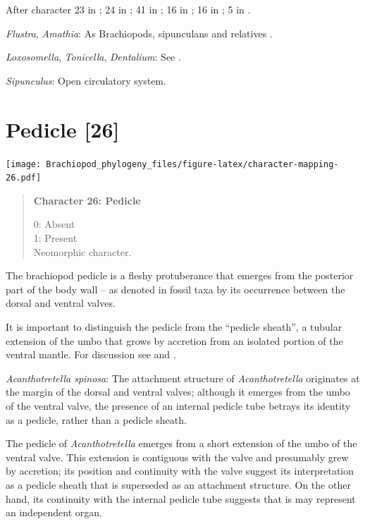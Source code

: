 \documentclass[openany]{book}
\begin{document}
After character 23 in \citet{Haszprunar1996}; 24 in
\citet{Haszprunar2000}; 41 in \citet{Rouse1999}; 16 in
\citet{Scheltema1993}; 16 in \citet{Vinther2008}; 5 in
\citet{Haszprunar2008}.

\hypertarget{Amathia-coding-25}{}
\emph{Flustra}, \emph{Amathia}: As Brachiopods, sipunculans and
relatives \citep{Ruppert1983}.

\hypertarget{Dentalium-coding-25}{}
\emph{Loxosomella}, \emph{Tonicella}, \emph{Dentalium}: See
\citet{Haszprunar2008}.

\hypertarget{Sipunculus-coding-25}{}
\emph{Sipunculus}: Open circulatory system.

\section{Pedicle {[}26{]}}\label{pedicle-26}

\texttt{[image: Brachiopod\_phylogeny\_files/figure-latex/character-mapping-26.pdf]}

\begin{quote}
\textbf{Character 26: Pedicle}

0: Absent\\
1: Present\\
Neomorphic character.
\end{quote}

The brachiopod pedicle is a fleshy protuberance that emerges from the
posterior part of the body wall -- as denoted in fossil taxa by its
occurrence between the dorsal and ventral valves.

It is important to distinguish the pedicle from the ``pedicle sheath'',
a tubular extension of the umbo that grows by accretion from an isolated
portion of the ventral mantle. For discussion see
\citet{Holmer2018Theattachment} and \citet{Bassett2017Earliestontogeny}.

\hypertarget{Acanthotretella_spinosa-coding-26}{}
\emph{Acanthotretella spinosa}: The attachment structure of
\emph{Acanthotretella} originates at the margin of the dorsal and
ventral valves; although it emerges from the umbo of the ventral valve,
the presence of an internal pedicle tube betrays its identity as a
pedicle, rather than a pedicle sheath.

The pedicle of \emph{Acanthotretella} emerges from a short extension of
the umbo of the ventral valve. This extension is contiguous with the
valve and presumably grew by accretion; its position and continuity with
the valve suggest its interpretation as a pedicle sheath that is
superseded as an attachment structure. On the other hand, its continuity
with the internal pedicle tube suggests that is may represent an
independent organ.
\end{document}
